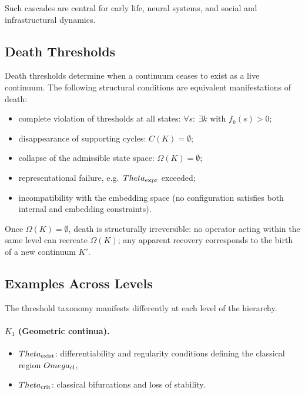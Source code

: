 Such cascades are central for early life, neural systems, and social and
infrastructural dynamics.

\subsection{Death Thresholds}

Death thresholds determine when a continuum ceases to exist as a live
continuum. The following structural conditions are equivalent manifestations of
death:
\begin{itemize}
    \item complete violation of thresholds at all states:
          \(\forall s:\ \exists k \text{ with } f_k(s) > 0\);
    \item disappearance of supporting cycles: \(C(K)=\emptyset\);
    \item collapse of the admissible state space: \(\Omega(K)=\emptyset\);
    \item representational failure, e.g.\ \(\Theta_{\rm expr}\) exceeded;
    \item incompatibility with the embedding space (no configuration satisfies
          both internal and embedding constraints).
\end{itemize}

Once \(\Omega(K)=\emptyset\), death is structurally irreversible:
no operator acting within the same level can recreate \(\Omega(K)\);
any apparent recovery corresponds to the birth of a new continuum \(K'\).

\subsection{Examples Across Levels}

The threshold taxonomy manifests differently at each level of the hierarchy.

\paragraph{\texorpdfstring{\(K_1\)}{K_1} (Geometric continua).}
\begin{itemize}
    \item \(\Theta_{\rm exist}\): differentiability and regularity conditions
          defining the classical region \(\Omega_{\rm cl}\),
    \item \(\Theta_{\rm crit}\): classical bifurcations and loss of stability.
\end{itemize}

